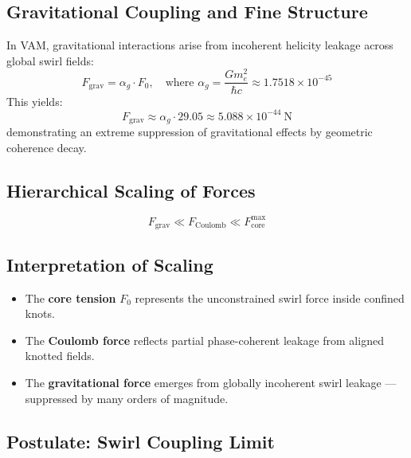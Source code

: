 \documentclass[preprint]{revtex4-2}
\begin{document}
            \subsection{Gravitational Coupling and Fine Structure}
            In VAM, gravitational interactions arise from incoherent helicity leakage across global swirl fields:
            \begin{equation}
                F_\text{grav} = \alpha_g \cdot F_0, \quad \text{where } \alpha_g = \frac{G m_e^2}{\hbar c} \approx 1.7518 \times 10^{-45}
            \label{eq:gravitational_scaling}
            \end{equation}
            This yields:
            \begin{equation}
                F_\text{grav} \approx \alpha_g \cdot 29.05 \approx 5.088 \times 10^{-44}~\text{N}
            \end{equation}
            demonstrating an extreme suppression of gravitational effects by geometric coherence decay.
        
            \subsection{Hierarchical Scaling of Forces}
            \begin{equation}
                \boxed{
                    F_\text{grav} \ll F_\text{Coulomb} \ll F_\text{core}^{\text{max}}
                }
            \end{equation}
        
            \subsection{Interpretation of Scaling}
            \begin{itemize}
                \item The \textbf{core tension} \( F_0 \) represents the unconstrained swirl force inside confined knots.
                \item The \textbf{Coulomb force} reflects partial phase-coherent leakage from aligned knotted fields.
                \item The \textbf{gravitational force} emerges from globally incoherent swirl leakage — suppressed by many orders of magnitude.
            \end{itemize}
        
            \subsection*{Postulate: Swirl Coupling Limit}
        
\end{document}
